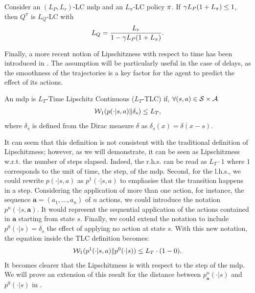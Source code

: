\begin{thm}
\label{th:lip_Q_function}
    Consider an $(L_P,L_r)$-LC \gls{mdp} and an $L_\pi$-LC policy $\policy$. If $\gamma L_P(1+L_\policy)\le 1$, then $Q^\pi$ is $L_Q$-LC with
    \begin{align*}
        L_Q=\frac{L_r}{1-\gamma L_P(1+L_\policy)}.
    \end{align*}
\end{thm}

Finally, a more recent notion of Lipschitzness with respect to time has been introduced in \cite[Assumption 4.1]{metelli2020control}. 
The assumption will be particularly useful in the case of delays, as the smoothness of the trajectories is a key factor for the agent to predict the effect of its actions. 

\begin{defi}
\label{def:time_lip}
An \gls{mdp} is $L_T$-Time Lipschitz Continuous ($L_T$-TLC) if, $\forall (s,a)\in \statespace\times\actionspace$
\begin{align*}
    \wassersteindistance[1](\transitionfunction(\cdot\vert s,a)\Vert \delta_s)\le L_T,
\end{align*}
where $\delta_s$ is defined from the Dirac measure $\delta$ as $\delta_s(x)=\delta(x-s)$.
\end{defi}

It can seem that this definition is not consistent with the traditional definition of Lipschitzness; however, as we will demonstrate, it can be seen as Lipschitzness w.r.t. the number of steps elapsed.
Indeed, the r.h.s. can be read as $L_T\cdot 1$ where $1$ corresponds to the unit of time, the step, of the \gls{mdp}. 
Second, for the l.h.s., we could rewrite $p(\cdot\vert s,a)$ as $p^1(\cdot\vert s,a)$ to emphasise that the transition happens in a step.
Considering the application of more than one action, for instance, the sequence $\boldsymbol a=(a_1,\dots,a_n)$ of $n$ actions, we could introduce the notation $p^n(\cdot\vert s,\boldsymbol a)$.
It would represent the sequential application of the actions contained in $\boldsymbol a$ starting from state $s$.
Finally, we could extend the notation to include $p^0(\cdot\vert s)=\delta_s$ the effect of applying no action at state $s$.
With this new notation, the equation inside the TLC definition becomes:
\begin{align*}
    \wassersteindistance[1](p^1(\cdot\vert s,a)\Vert p^0(\cdot\vert s))\le L_T\cdot (1-0).
\end{align*}
It becomes clearer that the Lipschitzness is with respect to the step of the \gls{mdp}.
We will prove an extension of this result for the distance between $p_{\boldsymbol a}^n(\cdot\vert s)$ and $p^0(\cdot\vert s)$ in .


